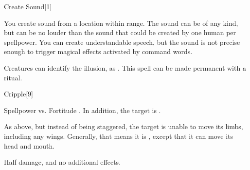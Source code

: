 \begin{spellsection}{Create Sound}[1]
    \begin{spellheader}
    \end{spellheader}
    \begin{spellcontent}
        \begin{spelltargetinginfo}
            \spellrng{\rngmed}
        \end{spelltargetinginfo}
        \begin{spelleffects}
            \spelleffect You create sound from a location within range. The sound can be of any kind, but can be no louder than the sound that could be created by one human per spellpower. You can create understandable speech, but the sound is not precise enough to trigger magical effects activated by command words.
            \spelldur \durshort \dismissable
        \end{spelleffects}
    \end{spellcontent}
    \begin{spellfooter}
        \spellnotes Creatures can identify the illusion, as . This spell can be made permanent with a  ritual.
        \miscastexplode
    \end{spellfooter}
\end{spellsection}

\begin{spellsection}{Cripple}[9]
    \begin{spellheader}
    \end{spellheader}
    \begin{spellcontent}
        \begin{spelltargetinginfo}
        \end{spelltargetinginfo}
        \begin{spelleffects}
            \begin{spellattack}{Spellpower vs. Fortitude}
                \spellsuccess {}. In addition, the target is \staggered.

                \spellcritical As above, but instead of being staggered, the target is unable to move its limbs, including any wings. Generally, that means it is \paralyzed, except that it can move its head and mouth.

                \spellfailure Half damage, and no additional effects.
            \end{spellattack}
            \spelldur \durshort
        \end{spelleffects}
    \end{spellcontent}
    \begin{spellfooter}
        \miscastrandom
    \end{spellfooter}
\end{spellsection}

